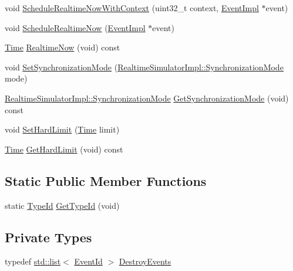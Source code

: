 \begin{DoxyCompactItemize}
\item 
void \hyperlink{classns3_1_1RealtimeSimulatorImpl_a7bf33f79d48e7b75dd306fed0f14c3c0}{Schedule\+Realtime\+Now\+With\+Context} (uint32\+\_\+t context, \hyperlink{classns3_1_1EventImpl}{Event\+Impl} $\ast$event)
\item 
void \hyperlink{classns3_1_1RealtimeSimulatorImpl_a3a8b07ddf0a22a6f77050528eece77cc}{Schedule\+Realtime\+Now} (\hyperlink{classns3_1_1EventImpl}{Event\+Impl} $\ast$event)
\item 
\hyperlink{classns3_1_1Time}{Time} \hyperlink{classns3_1_1RealtimeSimulatorImpl_a9f4e1144b7ca3d83d8fc789f1435c79e}{Realtime\+Now} (void) const 
\item 
void \hyperlink{classns3_1_1RealtimeSimulatorImpl_ae06074719bc5fe676498b8267bc5a81b}{Set\+Synchronization\+Mode} (\hyperlink{classns3_1_1RealtimeSimulatorImpl_a97b84e6926b9602a6d7c7326bf485807}{Realtime\+Simulator\+Impl\+::\+Synchronization\+Mode} mode)
\item 
\hyperlink{classns3_1_1RealtimeSimulatorImpl_a97b84e6926b9602a6d7c7326bf485807}{Realtime\+Simulator\+Impl\+::\+Synchronization\+Mode} \hyperlink{classns3_1_1RealtimeSimulatorImpl_ab6be7e9f4b02f78c5df45061a9c1fddd}{Get\+Synchronization\+Mode} (void) const 
\item 
void \hyperlink{classns3_1_1RealtimeSimulatorImpl_a665c879b7ff27eb6a98fb12b04f56490}{Set\+Hard\+Limit} (\hyperlink{classns3_1_1Time}{Time} limit)
\item 
\hyperlink{classns3_1_1Time}{Time} \hyperlink{classns3_1_1RealtimeSimulatorImpl_acaeede6ee0b8dd3490fc41fa5dc12820}{Get\+Hard\+Limit} (void) const 
\end{DoxyCompactItemize}
\subsection*{Static Public Member Functions}
\begin{DoxyCompactItemize}
\item 
static \hyperlink{classns3_1_1TypeId}{Type\+Id} \hyperlink{classns3_1_1RealtimeSimulatorImpl_a9d7848bcebc8200ddbb5393bcd1f2064}{Get\+Type\+Id} (void)
\end{DoxyCompactItemize}
\subsection*{Private Types}
\begin{DoxyCompactItemize}
\item 
typedef \hyperlink{openflow-interface_8h_afd9bcfa176617760671b67580f536fa7}{std\+::list}$<$ \hyperlink{classns3_1_1EventId}{Event\+Id} $>$ \hyperlink{classns3_1_1RealtimeSimulatorImpl_aece9db06c7b61b8d95fe54ac2c7b9108}{Destroy\+Events}
\end{DoxyCompactItemize}
